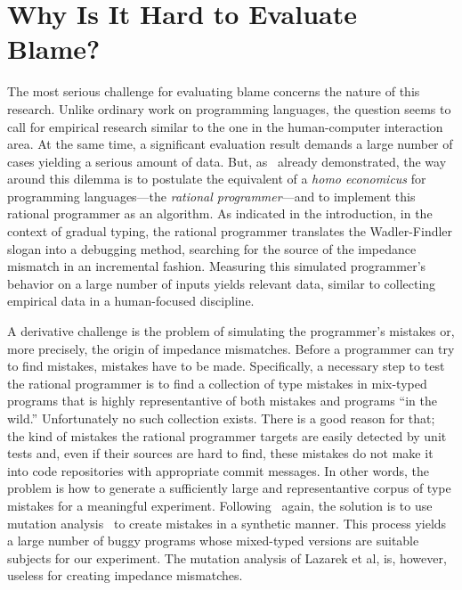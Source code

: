 
\section{Why Is It Hard to Evaluate Blame?}
\label{sec:challenges}

The most serious challenge for evaluating blame concerns 
the nature of this research. Unlike ordinary
work on programming languages, the question seems to call for empirical research
similar to the one in the human-computer interaction area. At the same time, a
significant evaluation result demands a large number of cases yielding a serious
amount of data. But, as~\citet{lksfd-popl-2020} already demonstrated, the way
around this dilemma is to postulate the equivalent of a {\it homo economicus\/}
for programming languages---the {\em rational programmer\/}---and to implement
this rational programmer as an algorithm.  As indicated in the introduction, in
the context of gradual typing, the rational programmer translates the
Wadler-Findler slogan into a debugging method, searching for the source of the
impedance mismatch in an incremental fashion. Measuring this simulated
programmer's behavior on a large number of inputs yields relevant 
data, similar to collecting empirical data in a human-focused discipline. 

A derivative challenge is the problem of simulating the programmer's
mistakes or, more precisely, the origin of impedance mismatches. Before a
programmer can try to find mistakes, mistakes have to be made.
Specifically, a necessary step to test the rational programmer is to find
a collection of  type mistakes in  mix-typed programs that is highly
representantive of both mistakes and programs ``in the wild.''
Unfortunately no such collection exists.  There is a good reason for that;
the kind of mistakes the rational programmer targets are easily detected
by unit tests and, even if their sources are hard to find, these mistakes do not make it
into code repositories with appropriate commit messages.  In other words, the problem is how to generate a
sufficiently large and representantive corpus of type mistakes for a meaningful
experiment.  Following~\citet{lksfd-popl-2020} again, the solution is to
use mutation analysis~\cite{lipton1971fault, demillo1978hints,
jia2011analysis} to create mistakes in a synthetic manner. This process
yields a large number of buggy programs whose mixed-typed versions are
suitable subjects for our experiment.  The mutation analysis of Lazarek et
al, is, however, useless for creating impedance mismatches.

